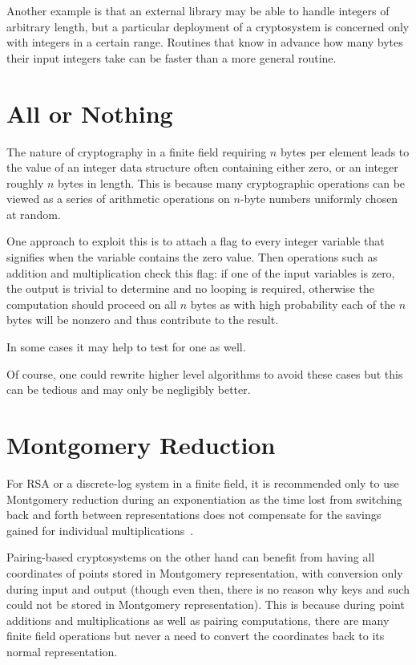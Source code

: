 Another example is that an external library may be able to handle integers
of arbitrary length, but a particular deployment of a cryptosystem is
concerned only with integers in a certain range. Routines that know
in advance how many bytes their input integers take can be faster than
a more general routine.

\section{All or Nothing}

The nature of cryptography in a finite field requiring $n$ bytes per element
leads to the value of an integer data structure
often containing either zero, or an integer roughly $n$ bytes in length.
This is because many cryptographic operations can be viewed as a series of
arithmetic operations on $n$-byte numbers uniformly chosen at random.

One approach to exploit this is to attach a flag to every integer variable
that signifies when the variable contains the zero value. Then operations
such as addition and multiplication check this flag: if one of the input
variables is zero, the output is trivial to determine and no looping
is required, otherwise the computation should proceed on all $n$ bytes as
with high probability each of the $n$ bytes will be nonzero and thus
contribute to the result.

In some cases it may help to test for one as well.

Of course, one could rewrite higher level algorithms to avoid these cases
but this can be tedious and may only be negligibly better.

\section{Montgomery Reduction}

For RSA or a discrete-log system in a finite field, it is recommended
only to use Montgomery reduction during an exponentiation
as the time lost from switching back and forth between representations
does not compensate for the savings gained for individual multiplications~\cite{handbook}.

Pairing-based cryptosystems on the other hand can benefit from having
all coordinates of points stored in Montgomery representation, with conversion
only during input and output (though even then, there is no reason why keys
and such could not be stored in Montgomery representation). This is because
during point additions and multiplications as well as pairing computations,
there are many finite field operations but never a need to convert the
coordinates back to its normal representation.

